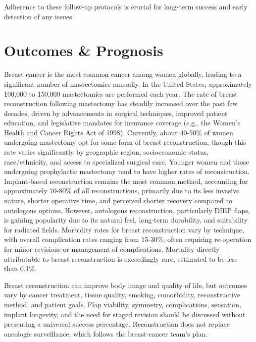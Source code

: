 Adherence to these follow-up protocols is crucial for long-term success and early detection of any issues.

\section*{Outcomes \& Prognosis}
Breast cancer is the most common cancer among women globally, leading to a significant number of mastectomies annually. In the United States, approximately 100,000 to 150,000 mastectomies are performed each year. The rate of breast reconstruction following mastectomy has steadily increased over the past few decades, driven by advancements in surgical techniques, improved patient education, and legislative mandates for insurance coverage (e.g., the Women's Health and Cancer Rights Act of 1998). Currently, about 40-50\% of women undergoing mastectomy opt for some form of breast reconstruction, though this rate varies significantly by geographic region, socioeconomic status, race/ethnicity, and access to specialized surgical care. Younger women and those undergoing prophylactic mastectomy tend to have higher rates of reconstruction. Implant-based reconstruction remains the most common method, accounting for approximately 70-80\% of all reconstructions, primarily due to its less invasive nature, shorter operative time, and perceived shorter recovery compared to autologous options. However, autologous reconstruction, particularly DIEP flaps, is gaining popularity due to its natural feel, long-term durability, and suitability for radiated fields. Morbidity rates for breast reconstruction vary by technique, with overall complication rates ranging from 15-30\%, often requiring re-operation for minor revisions or management of complications. Mortality directly attributable to breast reconstruction is exceedingly rare, estimated to be less than 0.1\%.

Breast reconstruction can improve body image and quality of life, but outcomes vary by cancer treatment, tissue quality, smoking, comorbidity, reconstructive method, and patient goals. Flap viability, symmetry, complications, sensation, implant longevity, and the need for staged revision should be discussed without presenting a universal success percentage. Reconstruction does not replace oncologic surveillance, which follows the breast-cancer team’s plan.

